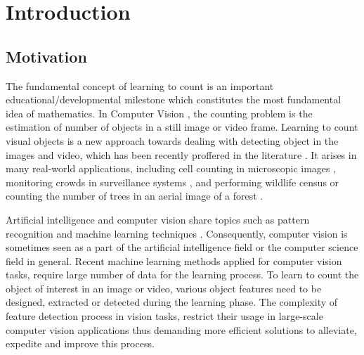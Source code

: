 \chapter{Introduction}
\label{sec:introduction}
\section{Motivation}
 
The fundamental concept of learning to count is an important educational/developmental milestone which constitutes the most fundamental idea of mathematics. In Computer Vision \cite{umbaugh1997computer}, the counting problem is the estimation of number of objects in a still image or video frame. Learning to count visual objects is a new approach towards dealing with detecting object in the images and video, which has been recently proffered in the literature \cite{viola2005detecting, rabaud2006counting, kong2005counting, chan2008privacy, segui2015learning}. It arises in many real-world applications, including cell counting in microscopic images \cite{flaccavento2011learning}, monitoring crowds in surveillance systems \cite{rahmalan2006crowd, valera2005intelligent}, and performing wildlife census or counting the number of trees in an aerial image of a forest \cite{brandtberg1998automated, pollock1996automatic,NIPS2010_4043}. 

Artificial intelligence and computer vision share topics such as pattern recognition and machine learning techniques \cite{michalski2013machine, mitchell1997machine}. Consequently, computer vision is sometimes seen as a part of the artificial intelligence field or the computer science field in general. Recent machine learning methods applied for computer vision tasks, require large number of data for the learning process. To learn to count the object of interest in an image or video, various object features need to be designed, extracted or detected during the learning phase. The complexity of feature detection process in vision tasks, restrict their usage in large-scale computer vision applications thus demanding more efficient solutions to alleviate, expedite and improve this process. 

